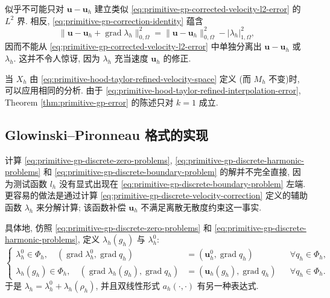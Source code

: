 \setcounter{statement}{5}
\renewcommand{\theHstatement}{remark.\thesection.\arabic{statement}}
\begin{Remark}\label{rem:primitive-gp-no-uncorrected-l2-bound}
似乎不可能只对 $\mathbf u-\mathbf u_h$ 建立类似
\eqref{eq:primitive-gp-corrected-velocity-l2-error} 的 $L^2$ 界. 相反,
\eqref{eq:primitive-gp-correction-identity} 蕴含
\[
\|\mathbf u-\mathbf u_h+\operatorname{grad}\lambda_h\|_{0,\Omega}^2
=\|\mathbf u-\mathbf u_h\|_{0,\Omega}^2-|\lambda_h|_{1,\Omega}^2,
\]
因而不能从 \eqref{eq:primitive-gp-corrected-velocity-l2-error} 中单独分离出
$\mathbf u-\mathbf u_h$ 或 $\lambda_h$. 这并不令人惊讶, 因为 $\lambda_h$
充当速度 $\mathbf u_h$ 的修正.
\end{Remark}

当 $X_h$ 由 \eqref{eq:primitive-hood-taylor-refined-velocity-space} 定义
(而 $M_h$ 不变)时, 可以应用相同的分析. 由于
\eqref{eq:primitive-hood-taylor-refined-interpolation-error}, Theorem
\ref{thm:primitive-gp-error} 的陈述只对 $k=1$ 成立.

\subsection{Glowinski--Pironneau 格式的实现}
\label{subsec:primitive-gp-implementation}

计算 \eqref{eq:primitive-gp-discrete-zero-problems},
\eqref{eq:primitive-gp-discrete-harmonic-problems} 和
\eqref{eq:primitive-gp-discrete-boundary-problem} 的解并不完全直接, 因为测试函数
$l_h$ 没有显式出现在 \eqref{eq:primitive-gp-discrete-boundary-problem} 左端.
更容易的做法是通过计算
\eqref{eq:primitive-gp-discrete-velocity-correction} 定义的辅助函数 $\lambda_h$
来分解计算; 该函数补偿 $\mathbf u_h$ 不满足离散无散度约束这一事实.

具体地, 仿照 \eqref{eq:primitive-gp-discrete-zero-problems} 和
\eqref{eq:primitive-gp-discrete-harmonic-problems}, 定义 $\lambda_h(g_h)$ 与
$\lambda_h^0$:
\begin{equation}\label{eq:primitive-gp-implementation-corrections}
\left\{
\begin{aligned}
\lambda_h^0\in\Phi_h,\quad
(\operatorname{grad}\lambda_h^0,\operatorname{grad}q_h)
&=(\mathbf u_h^0,\operatorname{grad}q_h)
&&\forall q_h\in\Phi_h,\\
\lambda_h(g_h)\in\Phi_h,\quad
(\operatorname{grad}\lambda_h(g_h),\operatorname{grad}q_h)
&=(\mathbf u_h(g_h),\operatorname{grad}q_h)
&&\forall q_h\in\Phi_h.
\end{aligned}
\right.
\end{equation}
于是 $\lambda_h=\lambda_h^0+\lambda_h(\rho_h)$, 并且双线性形式
$a_h(\cdot,\cdot)$ 有另一种表达式.

